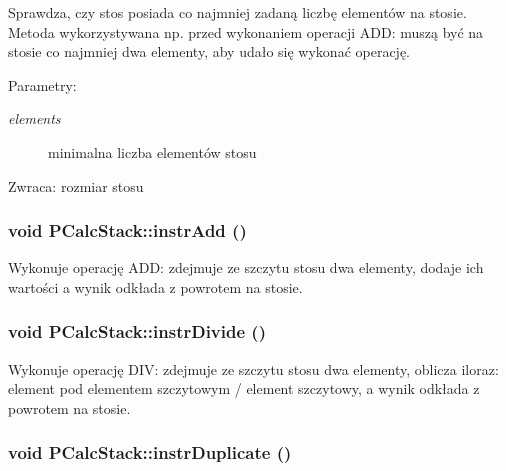 Sprawdza, czy stos posiada co najmniej zadaną liczbę elementów na stosie. Metoda wykorzystywana np. przed wykonaniem operacji ADD: muszą być na stosie co najmniej dwa elementy, aby udało się wykonać operację. \begin{Desc}
\item[Parametry:]
\begin{description}
\item[{\em elements}]minimalna liczba elementów stosu \end{description}
\end{Desc}
\begin{Desc}
\item[Zwraca:]rozmiar stosu \end{Desc}
\hypertarget{classPCalcStack_04ef30536acac1b02093153f1cb83353}{
\subsubsection[{instrAdd}]{\setlength{\rightskip}{0pt plus 5cm}void PCalcStack::instrAdd ()}}
\label{classPCalcStack_04ef30536acac1b02093153f1cb83353}


Wykonuje operację ADD: zdejmuje ze szczytu stosu dwa elementy, dodaje ich wartości a wynik odkłada z powrotem na stosie. \hypertarget{classPCalcStack_f642cacff51d21c2f25487dae1a5b84c}{
\subsubsection[{instrDivide}]{\setlength{\rightskip}{0pt plus 5cm}void PCalcStack::instrDivide ()}}
\label{classPCalcStack_f642cacff51d21c2f25487dae1a5b84c}


Wykonuje operację DIV: zdejmuje ze szczytu stosu dwa elementy, oblicza iloraz: element pod elementem szczytowym / element szczytowy, a wynik odkłada z powrotem na stosie. \hypertarget{classPCalcStack_0424a6bcacc8bee1a5ff074dea87be1e}{
\subsubsection[{instrDuplicate}]{\setlength{\rightskip}{0pt plus 5cm}void PCalcStack::instrDuplicate ()}}
\label{classPCalcStack_0424a6bcacc8bee1a5ff074dea87be1e}


